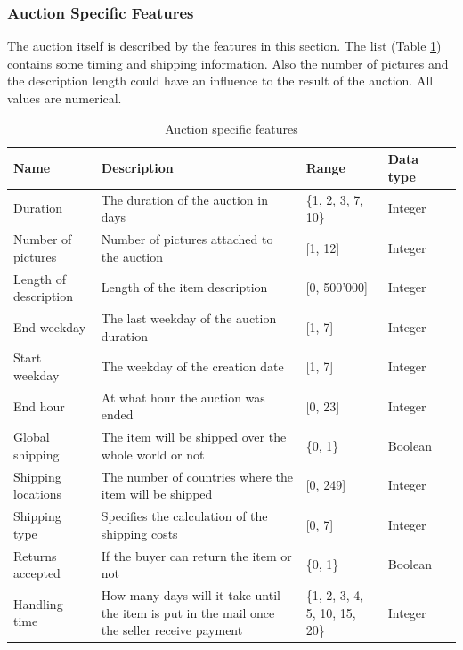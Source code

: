 \subsubsection{Auction Specific Features}
The auction itself is described by the features in this section. The list (Table \ref{tab:auction_features}) contains some timing and shipping information. Also the number of pictures and the description length could have an influence to the result of the auction. All values are numerical.
\begin{table}[h!]
	\begin{center}
	\begin{tabular}{| p{2.6cm} | p{2.6cm} | p{2.6cm} | p{2.6cm} | p{2.6cm} |}
		\hline
		\textbf{Name} & \textbf{Description} &  \textbf{Range} & \textbf{Data type} \\
		\hline
		Duration & The duration of the auction in days & \{1, 2, 3, 7, 10\} & Integer \\
		\hline
		Number of pictures & Number of pictures attached to the auction & [1, 12] & Integer \\
		\hline
		Length of description & Length of the item description & [0, 500'000] & Integer \\
		\hline
		End weekday & The last weekday of the auction duration & [1, 7] & Integer \\
		\hline
		Start weekday & The weekday of the creation date & [1, 7] & Integer \\
		\hline
		End hour & At what hour the auction was ended & [0, 23] & Integer \\
		\hline
		Global shipping & The item will be shipped over the whole world or not & \{0, 1\} & Boolean \\
		\hline
		Shipping locations & The number of countries where the item will be shipped & [0, 249] & Integer \\
		\hline
		Shipping type & Specifies the calculation of the shipping costs & [0, 7] & Integer \\
		\hline
		Returns accepted & If the buyer can return the item or not & \{0, 1\} & Boolean \\
		\hline
		Handling time & How many days will it take until the item is put in the mail once the seller receive payment & \{1, 2, 3, 4, 5, 10, 15, 20\} & Integer \\
		\hline
	\end{tabular}
	\end{center}
	\caption{Auction specific features}
	\label{tab:auction_features}
\end{table}
